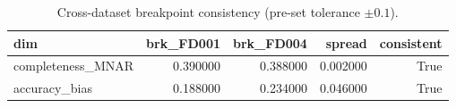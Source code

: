\begin{table}
\caption{Cross-dataset breakpoint consistency (pre-set tolerance $\pm0.1$).}
\label{tab:C3_cross_dataset}
\begin{tabular}{lrrrr}
\toprule
dim & brk_FD001 & brk_FD004 & spread & consistent \\
\midrule
completeness\_MNAR & 0.390000 & 0.388000 & 0.002000 & True \\
accuracy\_bias & 0.188000 & 0.234000 & 0.046000 & True \\
\bottomrule
\end{tabular}
\end{table}

